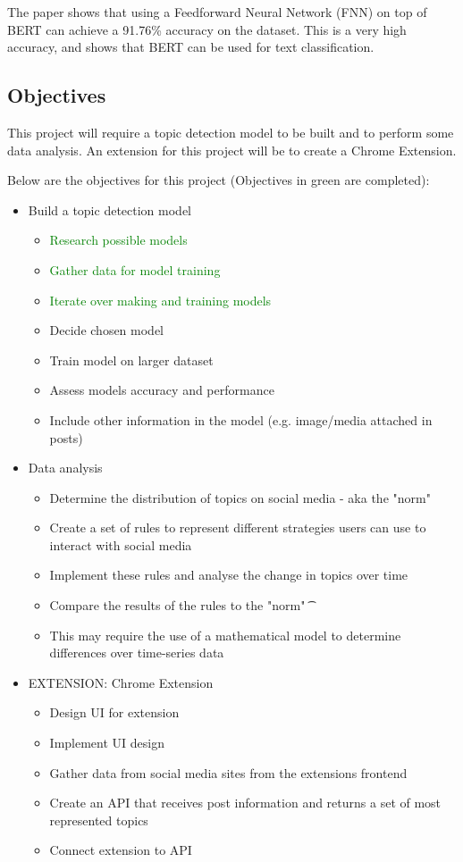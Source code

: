 The paper shows that using a Feedforward Neural Network (FNN) on top of BERT can achieve a 91.76\% accuracy on the dataset.
This is a very high accuracy, and shows that BERT can be used for text classification.\\

\subsection{Objectives}

This project will require a topic detection model to be built and to perform some data analysis.
An extension for this project will be to create a Chrome Extension.

Below are the objectives for this project (Objectives in green are completed):

\begin{itemize}
    \item Build a topic detection model
    \begin{itemize}
        \item \textcolor{green}{Research possible models}
        \item \textcolor{green}{Gather data for model training}
        \item \textcolor{green}{Iterate over making and training models}
        \item Decide chosen model
        \item Train model on larger dataset
        \item Assess models accuracy and performance
        \item Include other information in the model (e.g. image/media attached in posts)
    \end{itemize}
    \item Data analysis
    \begin{itemize}
        \item Determine the distribution of topics on social media - aka the "norm"
        \item Create a set of rules to represent different strategies users can use to interact with social media
        \item Implement these rules and analyse the change in topics over time
        \item Compare the results of the rules to the "norm"
        \t\item This may require the use of a mathematical model to determine differences over time-series data
    \end{itemize}
    \item EXTENSION: Chrome Extension
    \begin{itemize}
        \item Design UI for extension
        \item Implement UI design
        \item Gather data from social media sites from the extensions frontend
        \item Create an API that receives post information and returns a set of most represented topics
        \item Connect extension to API
    \end{itemize}
\end{itemize}